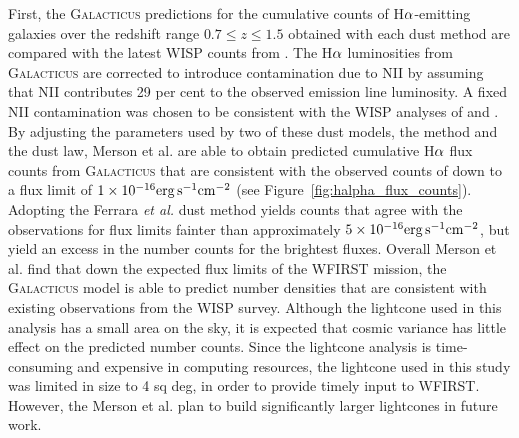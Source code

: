 First, the \textsc{Galacticus} predictions for the cumulative counts of H${\rm
\alpha}$-emitting galaxies over the redshift range $0.7\leqslant z\leqslant 1.5$
obtained with each dust method are compared with the latest WISP counts from
\citet{Mehta:2015}. The H${\rm \alpha}$ luminosities from \textsc{Galacticus} are
corrected to introduce contamination due to NII by assuming that NII contributes
29 per cent to the observed emission line luminosity. A fixed NII contamination
was chosen to be consistent with the WISP analyses of \citet{Colbert13} and
\citet{Mehta:2015}. By adjusting the parameters used by two of these dust models,
the \citet{Charlot00} method and the \citet{Calzetti00} dust law, Merson et al.
are able to obtain predicted cumulative H${\rm \alpha}$ flux counts from
\textsc{Galacticus} that are consistent with the observed counts of \citet{Mehta:2015} down to a flux limit of $1\times 10^{-16}{\rm
erg}\,{\rm s}^{-1}{\rm cm}^{-2}$ (see Figure~\ref{fig:halpha_flux_counts}).
Adopting the Ferrara \textit{et al.} \citet{Ferrara99} dust method yields counts
that agree with the observations for flux limits fainter than approximately
$5\times 10^{-16}{\rm erg}\,{\rm s}^{-1}{\rm cm}^{-2}$, but yield an excess in
the number counts for the brightest fluxes. Overall Merson et al. find that down
the expected flux limits of the WFIRST mission, the \textsc{Galacticus} model is
able to predict number densities that are consistent with existing observations
from the WISP survey. Although the lightcone used in this analysis has a small
area on the sky, it is expected that cosmic variance has little effect on the
predicted number counts. Since the lightcone analysis is time-consuming and
expensive in computing resources, the lightcone used in this study was limited
in size to 4 sq deg, in order to provide timely input to WFIRST. However, the
Merson et al. plan to build significantly larger lightcones in future work.

